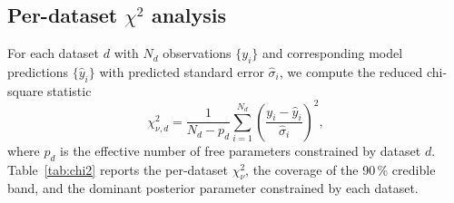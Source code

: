 \documentclass[11pt]{article}
\theoremstyle{plain}
\theoremstyle{definition}
\theoremstyle{remark}
\begin{document}
\subsection{Per-dataset $\chi^2$ analysis}\label{sec:val:chi2}

For each dataset $d$ with $N_d$ observations $\{y_i\}$ and corresponding
model predictions $\{\hat{y}_i\}$ with predicted standard error
$\hat{\sigma}_i$, we compute the reduced chi-square statistic
\begin{equation}
\chi^2_{\nu,d} = \frac{1}{N_d - p_d} \sum_{i=1}^{N_d}
                    \left(\frac{y_i - \hat{y}_i}{\hat{\sigma}_i}\right)^2,
\label{eq:chi2nu}
\end{equation}
where $p_d$ is the effective number of free parameters constrained by
dataset $d$.  Table~\ref{tab:chi2} reports the per-dataset
$\chi^2_\nu$, the coverage of the 90\,\% credible band, and the dominant
posterior parameter constrained by each dataset.
\end{document}
